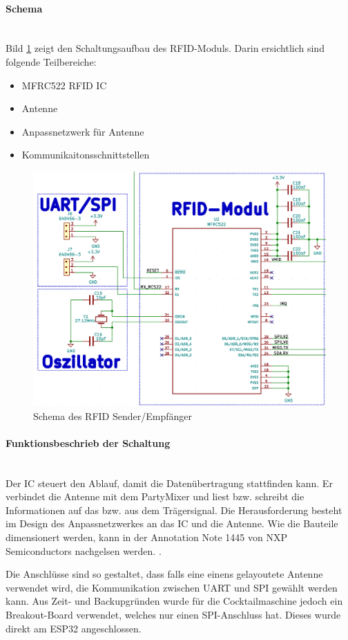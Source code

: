 \paragraph{Schema}\mbox{}\\

Bild \ref{fig:Schema_RFID} zeigt den Schaltungsaufbau des RFID-Moduls. Darin ersichtlich sind folgende Teilbereiche:

\begin{itemize}
\item MFRC522 RFID IC
\item Antenne
\item Anpassnetzwerk für Antenne
\item Kommunikaitonsschnittstellen
\end{itemize}

\begin{figure}[!h]
\center
\includegraphics[width = 0.6 \textwidth]{graphics/Schema_RFID}
\caption{Schema des RFID Sender/Empfänger}
\label{fig:Schema_RFID}
\end{figure}


\paragraph{Funktionsbeschrieb der Schaltung}\mbox{}\\

Der IC steuert den Ablauf, damit die Datenübertragung stattfinden kann. Er verbindet die Antenne mit dem PartyMixer und liest bzw. schreibt die Informationen auf das bzw. aus dem Trägersignal. Die Herausforderung besteht im Design des Anpassnetzwerkes an das IC und die Antenne. Wie die Bauteile dimensionert werden, kann in der Annotation Note 1445 von NXP Semiconductors nachgelsen werden. \cite{nxp_bv_2010_antenna_2010}.

Die Anschlüsse sind so gestaltet, dass falls eine einens gelayoutete Antenne verwendet wird, die Kommunikation zwischen UART und SPI gewählt werden kann. Aus Zeit- und Backupgründen wurde für die Cocktailmaschine jedoch ein Breakout-Board verwendet, welches nur einen SPI-Anschluss hat. Dieses wurde direkt am ESP32 angeschlossen.
